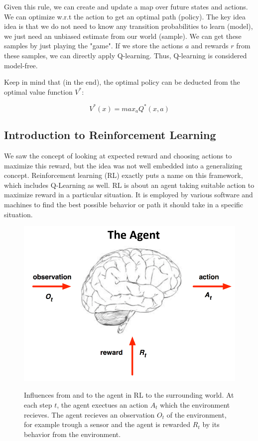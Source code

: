\documentclass[main]{subfiles}
\begin{document}
Given this rule, we can create and update a map over future states and actions. We can optimize w.r.t the action to get an optimal path (policy). The key idea idea is that we do not need to know any transition probabilities to learn (model), we just need an unbiased estimate from our world (sample). We can get these samples by just playing the "game". If we store the actions $a$ and rewards $r$ from these samples, we can directly apply Q-learning. Thus, Q-learning is considered model-free.

Keep in mind that (in the end), the optimal policy can be deducted from the optimal value function $V^*$:

\begin{equation}
    V^*(x) = max_a Q^*(x,a)
\end{equation}


\subsection{Introduction to Reinforcement Learning}
We saw the concept of looking at expected reward and choosing actions to maximize this reward, but the idea was not well embedded into a generalizing concept. 
Reinforcement learning (RL) exactly puts a name on this framework, which includes Q-Learning as well.
RL is about an agent taking suitable action to maximize reward in a particular situation. 
It is employed by various software and machines to find the best possible behavior or path it should take in a specific situation. 

\begin{figure}[H]
	\centering
	\includegraphics[width=0.9\linewidth]{08_ReinforcementLearning/figures/rl-basic-comps.png}
	\label{fig:rl-basic-comps}
	\caption{Influences from and to the agent in RL to the surrounding world. At each step $t$, the agent exectues an action $A_t$ which the environment recieves. The agent recieves an observation $O_t$ of the environment, for example trough a sensor and the agent is rewarded $R_t$ by its behavior from the environment.}
\end{figure}
\end{document}
